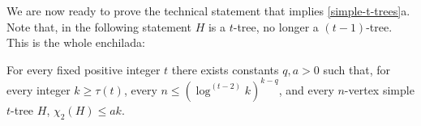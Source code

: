 \documentclass[kpfonts]{patmorin}
\newcommand{\trn}{\chi_2}
\theoremstyle{named}
\newcommand{\weirdref}[2]{\cref{#1}#2}
\begin{document}


We are now ready to prove the technical statement that implies \weirdref{simple-t-trees}{a}. Note that, in the following statement $H$ is a $t$-tree, no longer a $(t-1)$-tree.  This is the whole enchilada:


\begin{lem}\label{two-tree-technical}
    For every fixed positive integer $t$ there exists constants $q,a>0$ such that, for every integer $k\ge \tau(t)$, every $n\le (\log^{(t-2)} k)^{k-q}$, and every $n$-vertex simple $t$-tree $H$, $\trn(H)\le ak$.
\end{lem}
\end{document}
